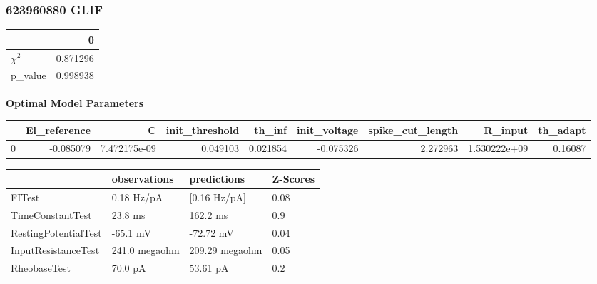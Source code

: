 \subsubsection{623960880 GLIF}\begin{tabular}{lr}
\toprule
{} &         0 \\
\midrule
$\chi^{2}$ &  0.871296 \\
p\_value    &  0.998938 \\
\bottomrule
\end{tabular}
\textbf{Optimal Model Parameters} \begin{tabular}{lrrrrrrrr}
\toprule
{} &  El\_reference &             C &  init\_threshold &    th\_inf &  init\_voltage &  spike\_cut\_length &       R\_input &  th\_adapt \\
\midrule
0 &     -0.085079 &  7.472175e-09 &        0.049103 &  0.021854 &     -0.075326 &          2.272963 &  1.530222e+09 &   0.16087 \\
\bottomrule
\end{tabular}
\begin{tabular}{llll}
\toprule
{} &   observations &     predictions & Z-Scores \\
\midrule
FITest               &     0.18 Hz/pA &    [0.16 Hz/pA] &     0.08 \\
TimeConstantTest     &        23.8 ms &        162.2 ms &      0.9 \\
RestingPotentialTest &       -65.1 mV &       -72.72 mV &     0.04 \\
InputResistanceTest  &  241.0 megaohm &  209.29 megaohm &     0.05 \\
RheobaseTest         &        70.0 pA &        53.61 pA &      0.2 \\
\bottomrule
\end{tabular}
